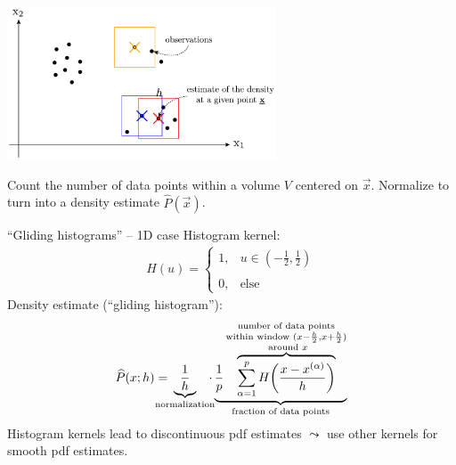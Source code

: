 \begin{frame}{\subsecname}
	
\begin{center}
	\includegraphics[width=0.6\textwidth]{./img/section1_fig1}
\end{center}

Count the number of data points within a volume $V$ centered on $\vec{x}$.
Normalize to turn into a density estimate $\widehat{P}(\vec{x})$.

\end{frame}

\begin{frame}[t]{``Gliding histograms'' -- 1D case}
\small
\vspace{-0.3cm}
Histogram kernel:
\begin{equation*}
\begin{array}{ll}
H({u}) = \left \{ \begin{array}{ll}
1, & u \in (-\frac{1}{2}, \frac{1}{2}) \\\\
0, & \text{else}
\end{array} \right.
\end{array}
\end{equation*}
Density estimate (``gliding histogram''):
\vspace{-0.3cm}
\begin{equation*}
	\widehat{P}({x};h) = 
	 \kern-3ex \underbrace{ \frac{1}{h}}_{
	\substack{ \text{normalization}}}
	 \kern-1.5ex 
\cdot \underbrace{ \frac{1}{p} 
	\overbrace{ \sum\limits_{\alpha = 1}^p
		H \bigg( \frac{{x} - {x}^{(\alpha)}}{
			h} \bigg) }^{
		\substack{\text{number of data points}\\
			\text{within window } (x-\frac{h}{2}, x+\frac{h}{2}) \\
			\text{ around } {x}}} }_{
	\text{fraction of data points}}
\end{equation*}
Histogram kernels lead to discontinuous pdf estimates $\leadsto$ use other kernels for smooth pdf estimates. 
\end{frame}


